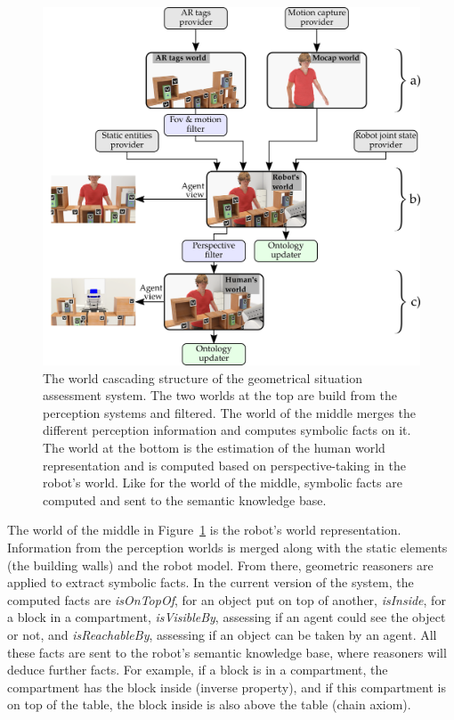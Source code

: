 \documentclass[a4paper,11pt,twoside]{StyleThese}
\begin{document}
\begin{figure}[b!]
	\centering
	\includegraphics[scale=0.12]{figures/chapter4/uwds/uwds.png}
	\caption{\label{chap9:fig:uwds} The world cascading structure of the geometrical situation assessment system. The two worlds at the top are build from the perception systems and filtered. The world of the middle merges the different perception information and computes symbolic facts on it. The world at the bottom is the estimation of the human world representation and is computed based on perspective-taking in the robot's world. Like for the world of the middle, symbolic facts are computed and sent to the semantic knowledge base.}
\end{figure}


The world of the middle in Figure~\ref{chap9:fig:uwds} is the robot's world representation. Information from the perception worlds is merged along with the static elements (the building walls) and the robot model.
From there, geometric reasoners are applied to extract symbolic facts. In the current version of the system, the computed facts are \textit{isOnTopOf}, for an object put on top of another, \textit{isInside}, for a block in a compartment, \textit{isVisibleBy}, assessing if an agent could see the object or not, and \textit{isReachableBy}, assessing if an object can be taken by an agent. All these facts are sent to the robot's semantic knowledge base, where reasoners will deduce further facts. For example, if a block is in a compartment, the compartment has the block inside (inverse property), and if this compartment is on top of the table, the block inside is also above the table (chain axiom).
\end{document}
